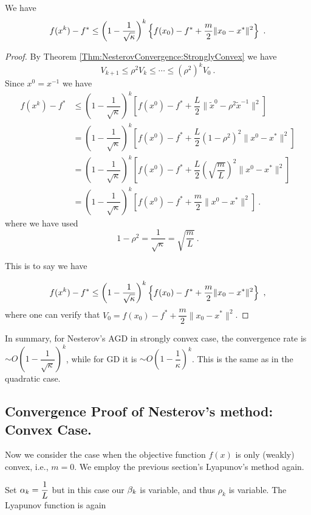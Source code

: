 \begin{corollary}\label{Corollary:NesterovConvergence:StronglyConvex:ConvergenceInf}
We have
$$f(x^k)-f^*\leq \left(1-\dfrac{1}{\sqrt{\kappa}}\right)^k\left\{f(x_0)-f^*+\dfrac{m}{2}\|x_0-x^*\|^2\right\} \ .$$
\end{corollary}

\begin{proof}
By Theorem \ref{Thm:NesterovConvergence:StronglyConvex} we have
\[
V_{k+1} \le \rho^2 V_k \le \cdots \le (\rho^2)^k V_0 \ .
\]
Since $x^0=x^{-1}$ we have
$$
\begin{array}{ll}
f(x^k)-f^* & \le
\left(1-\dfrac1{\sqrt{\kappa}}\right)^k
\left[
f(x^0)-f^*
+
\dfrac{L}{2}
\|
\tilde{x}^0 - \rho^2 \tilde{x}^{-1}
\|^2
\right]
\\
& =
\left(1-\dfrac1{\sqrt{\kappa}}\right)^k
\left[
f(x^0)-f^*
+
\dfrac{L}{2}
(1-\rho^2)^2
\|x^0-x^*\|^2
\right]
\\
& =
\left(1-\dfrac1{\sqrt{\kappa}}\right)^k
\left[
f(x^0)-f^*
+
\dfrac{L}{2}
\left(\sqrt{\dfrac{m}{L}}\right)^2
\|x^0-x^*\|^2
\right]
\\
& =
\left(1-\dfrac1{\sqrt{\kappa}}\right)^k
\left[
f(x^0)-f^*
+
\dfrac{m}{2}\|x^0-x^*\|^2
\right] \ .
\end{array}
$$
where we have used
\[
1-\rho^2 = \frac1{\sqrt{\kappa}} = \sqrt{\frac{m}{L}} \ .
\]

This is to say we have

$$f(x^k)-f^*\leq \left(1-\dfrac{1}{\sqrt{\kappa}}\right)^k\left\{f(x_0)-f^*+\dfrac{m}{2}\|x_0-x^*\|^2\right\} \ ,$$
where one can verify that $V_0=f(x_0)-f^*+\dfrac{m}{2}\|x_0-x^*\|^2$.
\end{proof}

In summary, for Nesterov's AGD in strongly convex case, the convergence rate is $
\sim
O\left(1-\dfrac1{\sqrt{\kappa}}\right)^k
$, while for GD it is $
\sim
O\left(1-\dfrac1{\kappa}\right)^k$. This is the same as in the quadratic case.

\subsection{Convergence Proof of Nesterov's method: Convex Case.}

Now we consider the case when the objective function $f(x)$ is only (weakly) convex, i.e., $m=0$. We employ the previous section's Lyapunov's method again. 

Set $\alpha_k=\dfrac{1}{L}$ but in this case our $\beta_k$ is variable, and thus $\rho_k$ is variable. The Lyapunov function is again


